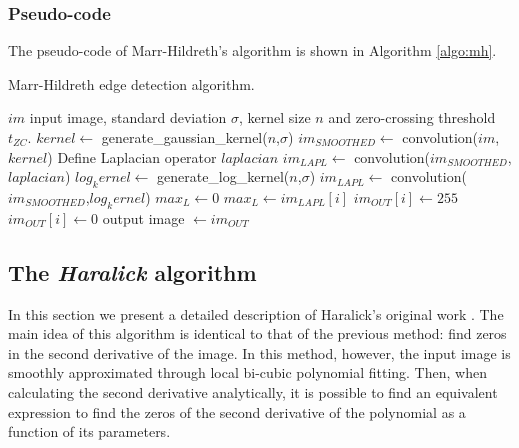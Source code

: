 \documentclass{ipol}
\numberwithin{equation}{section}
\numberwithin{table}{section}
\begin{document}
\subsubsection{Pseudo-code}

The pseudo-code of Marr-Hildreth's algorithm is shown in Algorithm \ref{algo:mh}.

\begin{algorithm}[t!]
\caption{Marr-Hildreth edge detection algorithm.}
\label{algo:mh}
\begin{algorithmic}[1]
\REQUIRE $im$ input image, standard deviation $\sigma$, kernel size $n$ and zero-crossing threshold $t_{ZC}$.
	\STATE $kernel \leftarrow$ generate\_gaussian\_kernel($n$,$\sigma$)
	\STATE $im_{SMOOTHED} \leftarrow$ convolution($im$,$kernel$)
	\STATE Define Laplacian operator $laplacian$
	\STATE $im_{LAPL} \leftarrow$ convolution($im_{SMOOTHED}$,$laplacian$)
\ELSE
\STATE $log_kernel \leftarrow$ generate\_log\_kernel($n$,$\sigma$)
\STATE $im_{LAPL} \leftarrow$ convolution($im_{SMOOTHED}$,$log_kernel$)
\ENDIF
\STATE $max_L \leftarrow 0$
		\STATE $max_L \leftarrow im_{LAPL}[i]$
	\ENDIF
\ENDFOR
{}
			\STATE $im_{OUT}[i] \leftarrow 255$
		\ELSE
			\STATE $im_{OUT}[i] \leftarrow 0$
		\ENDIF
	\ENDFOR
\ENDFOR
\RETURN output image $\leftarrow im_{OUT}$
\end{algorithmic}
\end{algorithm}


\subsection{The \textit{Haralick} algorithm}

In this section we present a detailed description of Haralick's original work \cite{bb20239}.
The main idea of this algorithm is identical to that of the previous method: find zeros in 
the second derivative of the image. In this method, however, the input image is smoothly approximated through local bi-cubic
polynomial fitting. Then, when calculating the second derivative analytically, it is possible to find 
an equivalent expression to find the zeros of the second derivative of the polynomial as a function of 
its parameters.%
\end{document}
